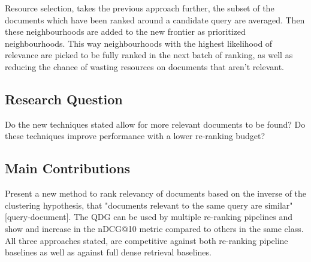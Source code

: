 \documentclass[sigconf,authorversion,nonacm]{acmart}
\begin{document}
Resource selection, takes the previous approach further, the subset of the documents which have been
ranked around a candidate query are averaged. Then these neighbourhoods are added to the new
frontier as prioritized neighbourhoods. This way neighbourhoods with the highest likelihood of
relevance are picked to be fully ranked in the next batch of ranking, as well as reducing the chance
of wasting resources on documents that aren't relevant.

\subsection{Research Question}

Do the new techniques stated allow for more relevant documents to be found?
Do these techniques improve performance with a lower re-ranking budget?

\subsection{Main Contributions}

Present a new method to rank relevancy of documents based on the inverse of the clustering
hypothesis, that "documents relevant to the same query are similar"[query-document]. The QDG can be
used by multiple re-ranking pipelines and show and increase in the nDCG@10 metric compared to others
in the same class. All three approaches stated, are competitive against both re-ranking pipeline
baselines as well as against full dense retrieval baselines.



\end{document}
